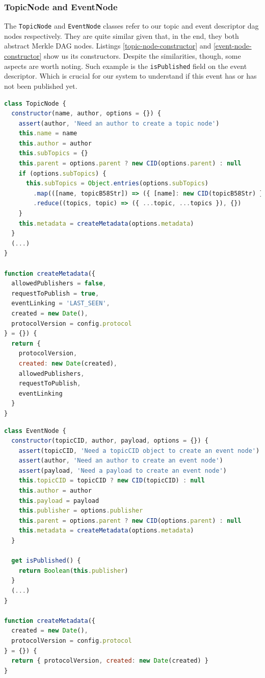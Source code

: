 \subsubsection{TopicNode and EventNode}\label{subsubsec:topic-node}

The \verb|TopicNode| and \verb|EventNode| classes refer to our topic and event
descriptor dag nodes respectively. They are quite similar given that, in the
end, they both abstract Merkle DAG nodes. Listings \ref{topic-node-constructor}
and \ref{event-node-constructor} show us its constructors. Despite the
similarities, though, some aspects are worth noting. Such example is the
\verb|isPublished| field on the event descriptor. Which is crucial for our
system to understand if this event has or has not been published yet.

\begin{lstlisting}[language=JavaScript, float=p, caption={TopicNode class constructor},label={topic-node-constructor}]
class TopicNode {
  constructor(name, author, options = {}) {
    assert(author, 'Need an author to create a topic node')
    this.name = name
    this.author = author
    this.subTopics = {}
    this.parent = options.parent ? new CID(options.parent) : null
    if (options.subTopics) {
      this.subTopics = Object.entries(options.subTopics)
        .map(([name, topicB58Str]) => ({ [name]: new CID(topicB58Str) }))
        .reduce((topics, topic) => ({ ...topic, ...topics }), {})
    }
    this.metadata = createMetadata(options.metadata)
  }
  (...)
}

function createMetadata({
  allowedPublishers = false,
  requestToPublish = true,
  eventLinking = 'LAST_SEEN',
  created = new Date(),
  protocolVersion = config.protocol
} = {}) {
  return {
    protocolVersion,
    created: new Date(created),
    allowedPublishers,
    requestToPublish,
    eventLinking
  }
}
\end{lstlisting}

\begin{lstlisting}[language=JavaScript, float=p, caption={EventNode class constructor},label={event-node-constructor}]
class EventNode {
  constructor(topicCID, author, payload, options = {}) {
    assert(topicCID, 'Need a topicCID object to create an event node')
    assert(author, 'Need an author to create an event node')
    assert(payload, 'Need a payload to create an event node')
    this.topicCID = topicCID ? new CID(topicCID) : null
    this.author = author
    this.payload = payload
    this.publisher = options.publisher
    this.parent = options.parent ? new CID(options.parent) : null
    this.metadata = createMetadata(options.metadata)
  }

  get isPublished() {
    return Boolean(this.publisher)
  }
  (...)
}

function createMetadata({
  created = new Date(),
  protocolVersion = config.protocol
} = {}) {
  return { protocolVersion, created: new Date(created) }
}

\end{lstlisting}

